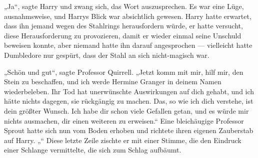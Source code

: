 „Ja“, sagte Harry und zwang sich, das Wort auszusprechen.
Es war eine Lüge, ausnahmsweise, und Harrys Blick war absichtlich gewesen. Harry hatte erwartet, dass ihn jemand wegen des Stahlrings herausfordern würde, er hatte versucht, diese Herausforderung zu provozieren, damit er wieder einmal seine Unschuld beweisen konnte, aber niemand hatte ihn darauf angesprochen — vielleicht hatte Dumbledore nur gespürt, dass der Stahl an sich nicht-magisch war.

„Schön und gut“, sagte Professor Quirrell.
„Jetzt komm mit mir, hilf mir, den Stein zu beschaffen, und ich werde Hermine Granger in deinem Namen wiederbeleben. Ihr Tod hat unerwünschte Auswirkungen auf dich gehabt, und ich hätte nichts dagegen, sie rückgängig zu machen. Das, so wie ich dich verstehe, ist dein größter Wunsch. Ich habe dir schon viele Gefallen getan, und es würde mir nichts ausmachen, dir einen weiteren zu erweisen.“
Eine bleichäugige Professor Sprout hatte sich nun vom Boden erhoben und richtete ihren eigenen Zauberstab auf Harry.
„“
Diese letzte Zeile zischte er mit einer Stimme, die den Eindruck einer Schlange vermittelte, die sich zum Schlag aufbäumt.

